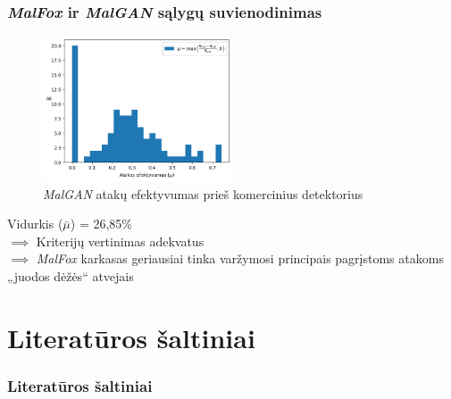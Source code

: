 \documentclass[12pt]{beamer}
\newcommand{\enquote}[1]{„#1“}
\begin{document}
\begin{frame}
    \frametitle{\textit{MalFox} ir \textit{MalGAN} sąlygų suvienodinimas}
    \begin{figure}
        \begin{small}
            \begin{center}
                \includegraphics[width=0.5\textwidth]{resources/mu_distribution.png}
            \end{center}
            \caption{\textit{MalGAN} atakų efektyvumas prieš komercinius detektorius}
        \end{small}
    \end{figure} \pause
    
    Vidurkis ($\bar{\mu}$) = 26,85\;\% \pause \\
    $\implies$ Kriterijų vertinimas adekvatus \pause \\
    $\implies$ \textit{MalFox} karkasas geriausiai tinka varžymosi principais pagrįstoms atakoms \enquote{juodos dėžės} atvejais

\end{frame}

\section{Literatūros šaltiniai}
\begin{frame}[t,allowframebreaks]
    \frametitle{Literatūros šaltiniai}
    \printbibliography
\end{frame}
\end{document}
